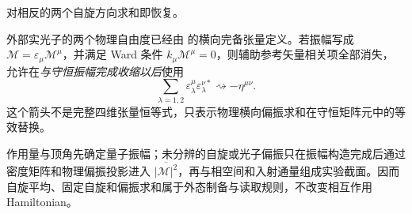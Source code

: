 对相反的两个自旋方向求和即恢复。

外部实光子的两个物理自由度已经由 的横向完备张量定义。若振幅写成 \(\mathcal M=\varepsilon_\mu\mathcal M^\mu\)，并满足 Ward 条件 \(k_\mu\mathcal M^\mu=0\)，则辅助参考矢量相关项全部消失， 允许在\emph{与守恒振幅完成收缩以后}使用
\begin{equation*}
 \sum_{\lambda=1,2}
 \varepsilon_\lambda^\mu\varepsilon_\lambda^{\nu *}
 \rightsquigarrow-\eta^{\mu\nu}.
\end{equation*}
这个箭头不是完整四维张量恒等式，只表示物理横向偏振求和在守恒矩阵元中的等效替换。

作用量与顶角先确定量子振幅；未分辨的自旋或光子偏振只在振幅构造完成后通过密度矩阵和物理偏振投影进入 $\overline{|\mathcal M|^2}$，再与相空间和入射通量组成实验截面。因而自旋平均、固定自旋和偏振求和属于外态制备与读取规则，不改变相互作用 Hamiltonian。

